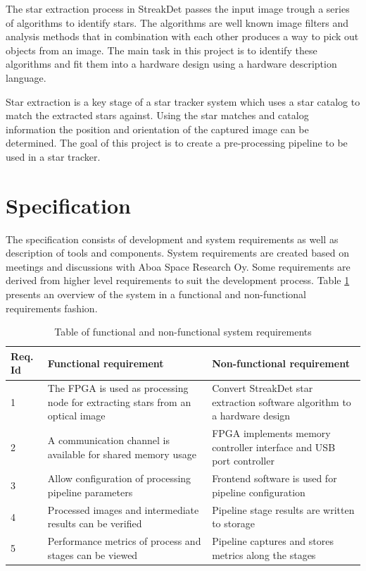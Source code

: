 \documentclass[12pt]{report}
\begin{document}
The star extraction process in StreakDet passes the input image trough a series of algorithms to identify stars. The algorithms are well known image filters and analysis methods that in combination with each other produces a way to pick out objects from an image. The main task in this project is to identify these algorithms and fit them into a hardware design using a hardware description language.
\par
Star extraction is a key stage of a star tracker system which uses a star catalog to match the extracted stars against. Using the star matches and catalog information the position and orientation of the captured image can be determined. The goal of this project is to create a pre-processing pipeline to be used in a star tracker.

\section{Specification}

The specification consists of development and system requirements as well as description of tools and components. System requirements are created based on meetings and discussions with Aboa Space Research Oy. Some requirements are derived from higher level requirements to suit the development process. Table \ref{table:1} presents an overview of the system in a functional and non-functional requirements fashion.

\begin{table}[h]
    \begin{tabular}{|p{1.75cm}|p{6.75cm}|p{6.75cm}|}
        \hline
        \textbf{Req. Id}& \textbf{Functional requirement}& \textbf{Non-functional requirement}\\
        \hline
        1&The FPGA is used as processing node for extracting stars from an optical image&Convert StreakDet star extraction software algorithm to a hardware design\\
        \hline
        2&A communication channel is available for shared memory usage&FPGA implements memory controller interface and USB port controller\\
        \hline
        3&Allow configuration of processing pipeline parameters&Frontend software is used for pipeline configuration\\
        \hline
        4&Processed images and intermediate results can be verified&Pipeline stage results are written to storage\\
        \hline
        5&Performance metrics of process and stages can be viewed&Pipeline captures and stores metrics along the stages\\
        \hline
    \end{tabular}
    \caption{Table of functional and non-functional system requirements}
    \label{table:1}
\end{table}
\end{document}
